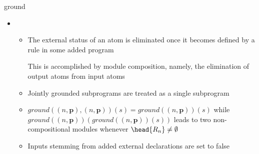 \begin{frame}{ground}
  \begin{itemize}
  \item {}
    \begin{itemize}\normalsize
    \item The external status of an atom is eliminated once it becomes defined by a rule in some added program
      \par
      This is accomplished by module composition, namely, the elimination of output atoms from input atoms
    \smallskip
    \item<2-> Jointly grounded subprograms are treated as a single subprogram
    \smallskip
    \item<3->  $\mathit{ground}((n,\boldsymbol{p}),(n,\boldsymbol{p}))(s)=\mathit{ground}((n,\boldsymbol{p}))(s)$ while
        $\mathit{ground}((n,\boldsymbol{p}))(\mathit{ground}((n,\boldsymbol{p}))(s))$
        leads to two non-compositional modules whenever $\head{R_n}\neq\emptyset$
    \smallskip
    \item<4-> Inputs stemming from added external declarations are set to false
    \end{itemize}
  \end{itemize}
\end{frame}
